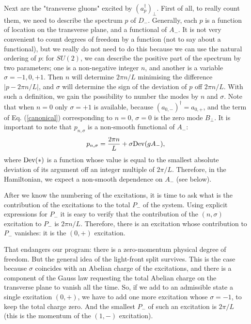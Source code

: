 \documentclass[a4paper,12pt]{article}
\begin{document}
Next are the "transverse gluons" excited by $(a_p^\dagger)_\perp$. 
First of all, to really count them, we need to describe 
the spectrum $p$ of $D_-$. Generally, 
each $p$ is a function of location on the transverse plane, 
and a functional of 
$A_-$. It is not very convenient to count degrees of freedom by a function
(not to say about a functional), but we really do not need to 
do this because we can 
use the natural ordering of $p$: for $SU(2)$, 
we can describe the positive part of 
the spectrum by two 
parameters;  one is a 
non-negative integer $n$, and another is 
a variable $\sigma = -1, 0, +1$. 
Then $n$ will determine $2\pi n/L$ minimising 
the difference $|p-2\pi n/L|$, and $\sigma$ 
will determine the sign of the 
deviation of $p$ off $2\pi n/L$. With such a definition, 
we gain the possibility to 
number the modes by $n$ and $\sigma$. Note that when $n=0$ 
only $\sigma=+1$ is available, because 
$(a_{0,-})^\dagger = a_{0,+}$, and the term of Eq.
(\ref{canonical}) corresponding to $n = 0$, $\sigma =0$ 
is the zero mode $B_\perp$. 
It is important to note that $p_{n,\sigma}$ 
is a non-smooth functional of $A_-$:
\begin{equation}
\label{p1}
p_{n,\sigma} = \frac{2\pi n}{L} + \sigma{\rm Dev}(gA_-),
\end{equation}
where ${\rm Dev}(*)$ is a function whose value 
is equal to the smallest absolute deviation of its argument off 
an integer multiple of $2\pi/L$. Therefore, in the 
Hamiltonian, we expect a non-smooth dependence on $A_-$ (see below).

After we know the numbering of the excitations, it is time 
to ask what is the contribution of the excitations 
to the total $P_-$ of the system. Using explicit 
expressions for $P_-$ \cite{KMPV} it is easy to verify that 
the contribution of the $(n, \sigma)$ excitation to 
$P_-$ is $2\pi n/L$. Therefore, there is an excitation 
whose contribution to $P_-$ vanishes: 
it is the $(0, +)$ excitation.

That endangers our program: there is a zero-momentum
physical degree of freedom. But the general idea of 
the light-front split survives. This is the case 
because $\sigma$ coincides with an Abelian charge 
of the excitations, and there is 
a component of the Gauss law requesting the total Abelian charge on the 
transverse plane to vanish all the time. So, if we add 
to an admissible state a single excitation $(0, +)$, 
we have to add one more excitation whose $\sigma = -1$, 
to keep the total charge zero. And the smallest 
$P_-$ of such an excitation is 
$2\pi/L$ (this is the momentum of the $(1, -)$ excitation).
\end{document}
